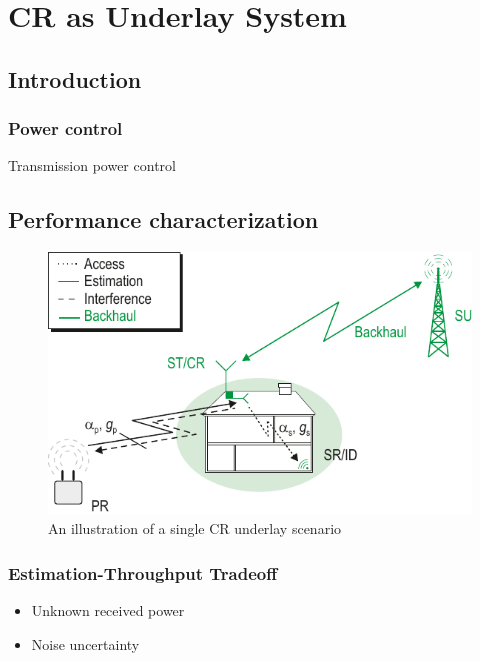 \chapter{CR as Underlay System}
\label{chapter:US}

\section{Introduction}
\subsection{Power control}
Transmission power control

\section{Performance characterization}
\begin{figure}[!t]
     \includegraphics[trim=0cm 0.0cm 0.0cm 0cm,clip=true,width=\columnwidth]{../kapitel04/figures/CR_Scenario_Underlay}
\caption{An illustration of a single \ac{CR} underlay scenario}
\label{fig:Und_Sc}
\end{figure}

\subsection{Estimation-Throughput Tradeoff}
\begin{itemize}
\item Unknown received power
\item Noise uncertainty
\end{itemize}


